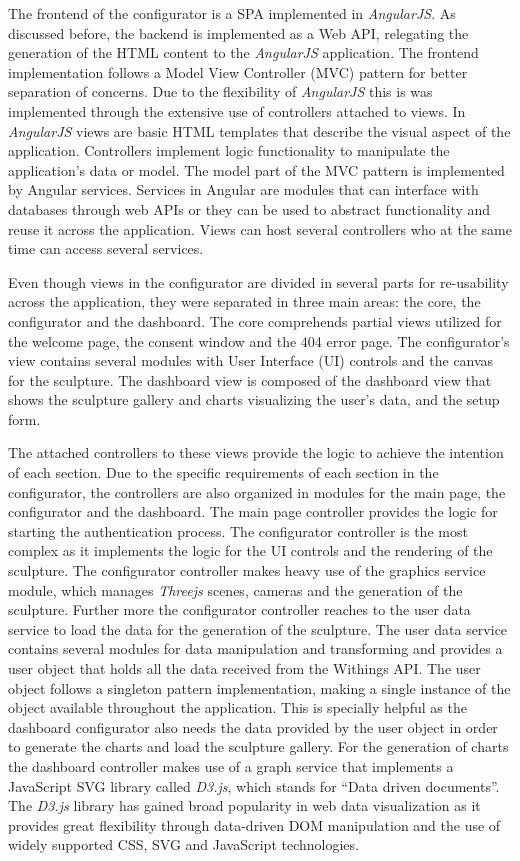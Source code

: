 \documentclass[../medieninformatik-arbeit.tex]{subfiles}
\begin{document}
The frontend of the configurator is a SPA implemented in \textit{AngularJS}. As discussed before, the backend is implemented as a Web API, relegating the generation of the HTML content to the \textit{AngularJS} application. The frontend implementation follows a Model View Controller (MVC) pattern for better separation of concerns. Due to the flexibility of \textit{AngularJS} this is was implemented through the extensive use of controllers attached to views. In \textit{AngularJS} views are basic HTML templates that describe the visual aspect of the application. Controllers implement logic functionality to manipulate the application's data or model. The model part of the MVC pattern is implemented by Angular services. Services in Angular are modules that can interface with databases through web APIs or they can be used to abstract functionality and reuse it across the application. Views can host several controllers who at the same time can access several services. 

Even though views in the configurator are divided in several parts for re-usability across the application, they were separated in three main areas: the core, the configurator and the dashboard. The core comprehends partial views utilized for the welcome page, the consent window and the 404 error page. The configurator's view contains several modules with User Interface (UI) controls and the canvas for the sculpture. The dashboard view is composed of the dashboard view that shows the sculpture gallery and charts visualizing the user's data, and the setup form. 

The attached controllers to these views provide the logic to achieve the intention of each section. Due to the specific requirements of each section in the configurator, the controllers are also organized in modules for the main page, the configurator and the dashboard. The main page controller provides the logic for starting the authentication process. The configurator controller is the most complex as it implements the logic for the UI controls and the rendering of the sculpture. The configurator controller makes heavy use of the graphics service module, which manages \textit{Threejs} scenes, cameras and the generation of the sculpture. Further more the configurator controller reaches to the user data service to load the data for the generation of the sculpture. The user data service contains several modules for data manipulation and transforming and provides a user object that holds all the data received from the Withings API. The user object follows a singleton pattern implementation, making a single instance of the object available throughout the application. This is specially helpful as the dashboard configurator also needs the data provided by the user object in order to generate the charts and load the sculpture gallery. For the generation of charts the dashboard controller makes use of a graph service that implements a JavaScript SVG library called \textit{D3.js}\cite{bostock2015d3js}, which stands for ``Data driven documents''. The \textit{D3.js} library has gained broad popularity in web data visualization as it provides great flexibility through data-driven DOM manipulation and the use of widely supported CSS, SVG and JavaScript technologies. 
\end{document}
